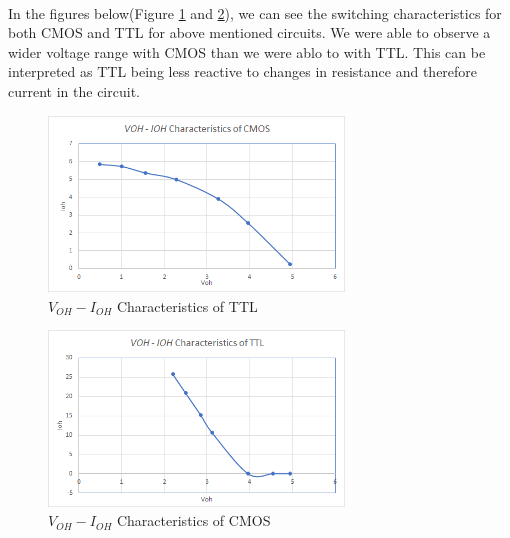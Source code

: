 \documentclass[pdftex,12pt,a4paper]{article}
\begin{document}
\begin{flushleft}
\paragraph{}
In the figures below(Figure \ref{graph:3-part1b-ttl} and \ref{graph:3-part1b-cmoss}), we can see the switching characteristics for both CMOS and TTL for above mentioned circuits. We were able to observe a wider voltage range with CMOS than we were ablo to with TTL. This can be interpreted as TTL being less reactive to changes in resistance and therefore current in the circuit.
 \begin{figure}[h]
    	\centering
    	\includegraphics[width=0.7\textwidth]{charts/part1b-cmos-chart.png}	
    	\caption{$V_{OH} - I_{OH}$ Characteristics of TTL}
    	\label{graph:3-part1b-ttl}
\end{figure}

 \begin{figure}[h]
    	\centering
    	\includegraphics[width=0.7\textwidth]{charts/part1b-ttl-chart.png}
    	\caption{$V_{OH} - I_{OH}$ Characteristics of CMOS}
    	\label{graph:3-part1b-cmoss}
\end{figure}



\end{flushleft}
\end{document}
